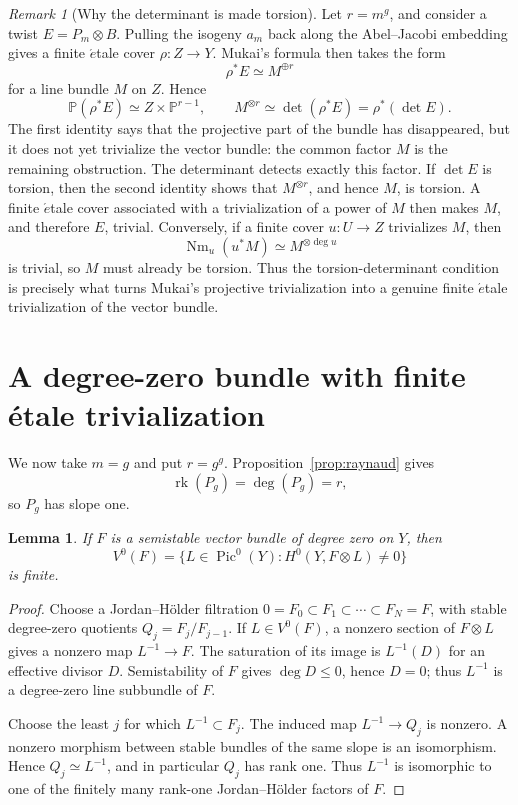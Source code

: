 \documentclass[a4paper]{amsart}
\newtheorem{lemma}[theorem]{Lemma}
\theoremstyle{remark}
\newtheorem{remark}[theorem]{Remark}
\DeclareMathOperator{\Pic}{Pic}
\DeclareMathOperator{\rk}{rk}
\begin{document}
\begin{remark}[Why the determinant is made torsion]\label{rem:projective}
Let \(r=m^g\), and consider a twist \(E=P_m\otimes B\).  Pulling the isogeny \(a_m\) back along the Abel--Jacobi embedding gives a finite \(\acute{e}\)tale cover \(\rho:Z\to Y\).  Mukai's formula then takes the form
\[
 \rho^*E\simeq M^{\oplus r}
\]
for a line bundle \(M\) on \(Z\).  Hence
\[
 \mathbb P(\rho^*E)\simeq Z\times\mathbb P^{r-1},
 \qquad
 M^{\otimes r}\simeq\det(\rho^*E)=\rho^*(\det E).
\]
The first identity says that the projective part of the bundle has disappeared, but it does not yet trivialize the vector bundle: the common factor \(M\) is the remaining obstruction.  The determinant detects exactly this factor.  If \(\det E\) is torsion, then the second identity shows that \(M^{\otimes r}\), and hence \(M\), is torsion.  A finite \(\acute{e}\)tale cover associated with a trivialization of a power of \(M\) then makes \(M\), and therefore \(E\), trivial.  Conversely, if a finite cover \(u:U\to Z\) trivializes \(M\), then
\[
 \operatorname{Nm}_u(u^*M)\simeq M^{\otimes\deg u}
\]
is trivial, so \(M\) must already be torsion.  Thus the torsion-determinant condition is precisely what turns Mukai's projective trivialization into a genuine finite \(\acute{e}\)tale trivialization of the vector bundle.
\end{remark}

\section{A degree-zero bundle with finite étale trivialization}

We now take \(m=g\) and put \(r=g^g\).  Proposition~\ref{prop:raynaud} gives
\[
 \rk(P_g)=\deg(P_g)=r,
\]
so \(P_g\) has slope one.

\begin{lemma}\label{lem:finite-support}
If \(F\) is a semistable vector bundle of degree zero on \(Y\), then
\[
 V^0(F)=\{L\in\Pic^0(Y):H^0(Y,F\otimes L)\neq 0\}
\]
is finite.
\end{lemma}

\begin{proof}
Choose a Jordan--H\"older filtration
\(0=F_0\subset F_1\subset\cdots\subset F_N=F\), with stable degree-zero quotients \(Q_j=F_j/F_{j-1}\).  If \(L\in V^0(F)\), a nonzero section of \(F\otimes L\) gives a nonzero map \(L^{-1}\to F\).  The saturation of its image is \(L^{-1}(D)\) for an effective divisor \(D\).  Semistability of \(F\) gives \(\deg D\leq 0\), hence \(D=0\); thus \(L^{-1}\) is a degree-zero line subbundle of \(F\).

Choose the least \(j\) for which \(L^{-1}\subset F_j\).  The induced map \(L^{-1}\to Q_j\) is nonzero.  A nonzero morphism between stable bundles of the same slope is an isomorphism.  Hence \(Q_j\simeq L^{-1}\), and in particular \(Q_j\) has rank one.  Thus \(L^{-1}\) is isomorphic to one of the finitely many rank-one Jordan--H\"older factors of \(F\).
\end{proof}
\end{document}
